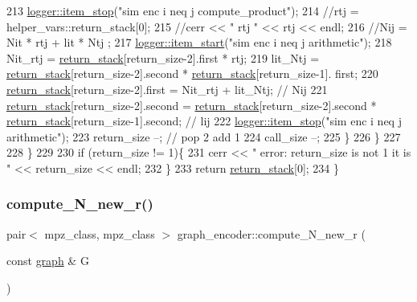 \begin{DoxyCode}
213         \hyperlink{classlogger_a6775fee9681c437fc9c05d71cfbbe4a2}{logger::item\_stop}(\textcolor{stringliteral}{"sim enc i neq j compute\_product"});
214         \textcolor{comment}{//rtj = helper\_vars::return\_stack[0];}
215         \textcolor{comment}{//cerr << " rtj " << rtj << endl;}
216         \textcolor{comment}{//Nij = Nit * rtj + lit * Ntj ;}
217         \hyperlink{classlogger_a7e21ec6ad2d40cfc2c6a383521b5641a}{logger::item\_start}(\textcolor{stringliteral}{"sim enc i neq j arithmetic"});
218         Nit\_rtj = \hyperlink{namespacehelper__vars_a6d2100c373830cacd232319a9958652d}{return\_stack}[return\_size-2].first * rtj;
219         lit\_Ntj = \hyperlink{namespacehelper__vars_a6d2100c373830cacd232319a9958652d}{return\_stack}[return\_size-2].second * \hyperlink{namespacehelper__vars_a6d2100c373830cacd232319a9958652d}{return\_stack}[return\_size-1].
      first;
220         \hyperlink{namespacehelper__vars_a6d2100c373830cacd232319a9958652d}{return\_stack}[return\_size-2].first = Nit\_rtj + lit\_Ntj; \textcolor{comment}{// Nij}
221         \hyperlink{namespacehelper__vars_a6d2100c373830cacd232319a9958652d}{return\_stack}[return\_size-2].second = \hyperlink{namespacehelper__vars_a6d2100c373830cacd232319a9958652d}{return\_stack}[return\_size-2].second * 
      \hyperlink{namespacehelper__vars_a6d2100c373830cacd232319a9958652d}{return\_stack}[return\_size-1].second; \textcolor{comment}{// lij}
222         \hyperlink{classlogger_a6775fee9681c437fc9c05d71cfbbe4a2}{logger::item\_stop}(\textcolor{stringliteral}{"sim enc i neq j arithmetic"});
223         return\_size --; \textcolor{comment}{// pop 2 add 1}
224         call\_size --;
225       \}
226     \}
227 
228   \}
229 
230   \textcolor{keywordflow}{if} (return\_size != 1)\{
231     cerr << \textcolor{stringliteral}{" error: return\_size is not 1 it is "} << return\_size << endl;
232   \}
233   \textcolor{keywordflow}{return} \hyperlink{namespacehelper__vars_a6d2100c373830cacd232319a9958652d}{return\_stack}[0];
234 \}
\end{DoxyCode}
\mbox{\label{classgraph__encoder_a0f53e165b1206e4ac0f36cf311e97baf}} 
\subsubsection{\texorpdfstring{compute\+\_\+\+N\+\_\+new\+\_\+r()}{compute\_N\_new\_r()}}
{\footnotesize\ttfamily pair$<$ mpz\+\_\+class, mpz\+\_\+class $>$ graph\+\_\+encoder\+::compute\+\_\+\+N\+\_\+new\+\_\+r (\begin{DoxyParamCaption}\item[{const \hyperlink{classgraph}{graph} \&}]{G }\end{DoxyParamCaption})}


